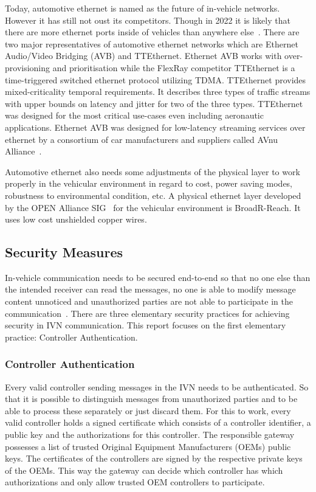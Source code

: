 Today, automotive ethernet is named as the future of in-vehicle networks.
However it has still not oust its competitors. Though in 2022 it is likely that
there are more ethernet ports inside of vehicles than anywhere
else~\cite{Ixia2014}. There are two major representatives of automotive ethernet
networks which are Ethernet Audio/Video Bridging (AVB) and TTEthernet. Ethernet
AVB works with over-provisioning and prioritisation while the FlexRay competitor
TTEthernet is a time-triggered switched ethernet protocol utilizing TDMA\@.
TTEthernet provides mixed-criticality temporal requirements. It describes three
types of traffic streams with upper bounds on latency and jitter for two of the
three types. TTEthernet was designed for the most critical use-cases even
including aeronautic applications. Ethernet AVB was designed for low-latency
streaming services over ethernet by a consortium of car manufacturers and
suppliers called AVnu Alliance~\cite{AVNU2018}.

Automotive ethernet also needs some adjustments of the physical layer to work
properly in the vehicular environment in regard to cost, power saving modes,
robustness to environmental condition, etc. A physical ethernet layer developed
by the OPEN Alliance SIG~\cite{SIG2018} for the vehicular environment is
BroadR-Reach. It uses low cost unshielded copper wires. 

\subsection{Security Measures}

In-vehicle communication needs to be secured end-to-end so that no one else than
the intended receiver can read the messages, no one is able to modify message
content unnoticed and unauthorized parties are not able to participate in the
communication~\cite{Lemke2006}. There are three elementary security practices
for achieving security in IVN communication. This report focuses on the first
elementary practice: Controller Authentication.

\subsubsection{Controller Authentication}

Every valid controller sending messages in the IVN needs to be authenticated. So
that it is possible to distinguish messages from unauthorized parties and to be
able to process these separately or just discard them. For this to work, every
valid controller holds a signed certificate which consists of a controller
identifier, a public key and the authorizations for this controller. The
responsible gateway possesses a list of trusted Original Equipment Manufacturers
(OEMs) public keys. The certificates of the controllers are signed by the
respective private keys of the OEMs. This way the gateway can decide which
controller has which authorizations and only allow trusted OEM controllers to
participate.

